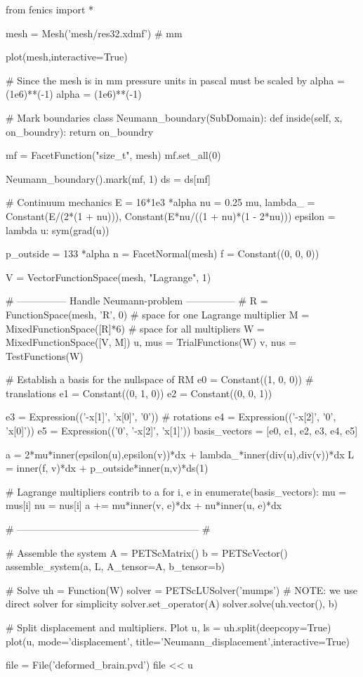 \documentclass[epsfig,11pt]{article}
\begin{document}
\begin{python}
from fenics import *

mesh = Mesh('mesh/res32.xdmf')	# mm

plot(mesh,interactive=True)

# Since the mesh is in mm pressure units in pascal must be scaled by alpha = (1e6)**(-1)
alpha = (1e6)**(-1)

# Mark boundaries
class Neumann_boundary(SubDomain):
	def inside(self, x, on_boundry):
		return on_boundry

mf = FacetFunction("size_t", mesh)
mf.set_all(0)

Neumann_boundary().mark(mf, 1)
ds = ds[mf]

# Continuum mechanics
E = 16*1e3 *alpha
nu = 0.25
mu, lambda_ = Constant(E/(2*(1 + nu))), Constant(E*nu/((1 + nu)*(1 - 2*nu)))
epsilon = lambda u: sym(grad(u))

p_outside = 133 *alpha
n = FacetNormal(mesh)
f = Constant((0, 0, 0))

V = VectorFunctionSpace(mesh, "Lagrange", 1)

# --------------- Handle Neumann-problem --------------- #
R = FunctionSpace(mesh, 'R', 0)        		 # space for one Lagrange multiplier
M = MixedFunctionSpace([R]*6)          		 # space for all multipliers
W = MixedFunctionSpace([V, M])
u, mus = TrialFunctions(W)
v, nus = TestFunctions(W)

# Establish a basis for the nullspace of RM
e0 = Constant((1, 0, 0))				# translations
e1 = Constant((0, 1, 0))
e2 = Constant((0, 0, 1))

e3 = Expression(('-x[1]', 'x[0]', '0')) # rotations
e4 = Expression(('-x[2]', '0', 'x[0]'))
e5 = Expression(('0', '-x[2]', 'x[1]'))
basis_vectors = [e0, e1, e2, e3, e4, e5]

a = 2*mu*inner(epsilon(u),epsilon(v))*dx + lambda_*inner(div(u),div(v))*dx
L = inner(f, v)*dx + p_outside*inner(n,v)*ds(1)

# Lagrange multipliers contrib to a
for i, e in enumerate(basis_vectors):
	mu = mus[i]
	nu = nus[i]
	a += mu*inner(v, e)*dx + nu*inner(u, e)*dx

# -------------------------------------------------------- #

# Assemble the system
A = PETScMatrix()
b = PETScVector()
assemble_system(a, L, A_tensor=A, b_tensor=b)

# Solve
uh = Function(W)
solver = PETScLUSolver('mumps') # NOTE: we use direct solver for simplicity
solver.set_operator(A)
solver.solve(uh.vector(), b)

# Split displacement and multipliers. Plot
u, ls = uh.split(deepcopy=True) 
plot(u, mode='displacement', title='Neumann_displacement',interactive=True)

file = File('deformed_brain.pvd')
file << u

\end{python}
\end{document}
